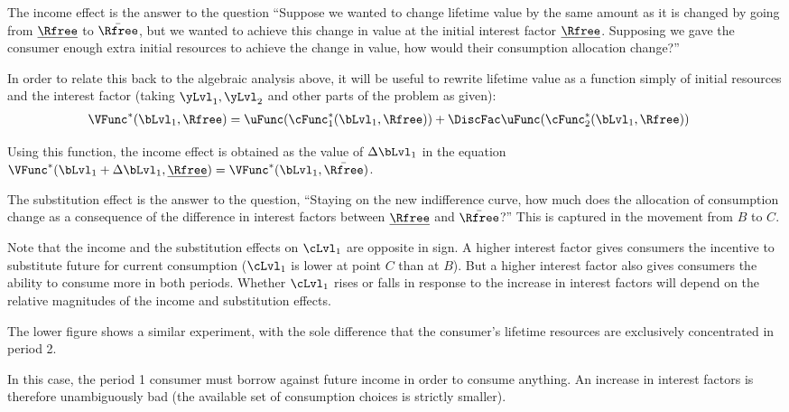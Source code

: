 \documentclass{scrartcl}
\begin{document}
  The income effect is the answer to the question ``Suppose we wanted to change lifetime value by the same amount as it is changed by going from $\underline{\Rfree}$ to $\bar{\Rfree}$, but we wanted to achieve this change in value at the initial interest factor $\underline{\Rfree}$.
  Supposing we gave the consumer enough extra initial resources to achieve the change in value, how would their consumption allocation change?''

  In order to relate this back to the algebraic analysis above, it will be useful to rewrite lifetime value as a function simply of initial resources and the interest factor (taking ${\yLvl_{1},\yLvl_{2}}$ and other parts of the problem as given):
  \begin{equation}\begin{gathered}\begin{aligned} \VFunc^{*}(\bLvl_{1},\Rfree) & = \uFunc(\cFunc_{1}^{*}(\bLvl_{1},\Rfree))+\DiscFac \uFunc(\cFunc_{2}^{*}(\bLvl_{1},\Rfree))
      \end{aligned}\end{gathered}\end{equation}

  Using this function, the income effect is obtained as the value of $\Delta \bLvl_{1}$ in the equation $\VFunc^{*}(\bLvl_{1}+\Delta \bLvl_{1},\underline{\Rfree})=\VFunc^{*}(\bLvl_{1},\bar{\Rfree})$.

  The substitution effect is the answer to the question, ``Staying on the new indifference curve, how much does the allocation of consumption change as a consequence of the difference in interest factors between $\underline{\Rfree}$ and $\bar{\Rfree}$?''  This is captured in the movement from $B$ to $C$.

  Note that the income and the substitution effects on $\cLvl_{1}$ are opposite in sign.
  A higher interest factor gives consumers the incentive to substitute future for current consumption ($\cLvl_{1}$ is lower at point $C$ than at $B$).
  But a higher interest factor also gives consumers the ability to consume more in both periods.
  Whether $\cLvl_{1}$ rises or falls in response to the increase in interest factors will depend on the relative magnitudes of the income and substitution effects.

  The lower figure shows a similar experiment, with the sole difference that the consumer's lifetime resources are exclusively concentrated in period 2.

  In this case, the period 1 consumer must borrow against future income in order to consume anything.
  An increase in interest factors is therefore unambiguously bad (the available set of consumption choices is strictly smaller).
\end{document}
